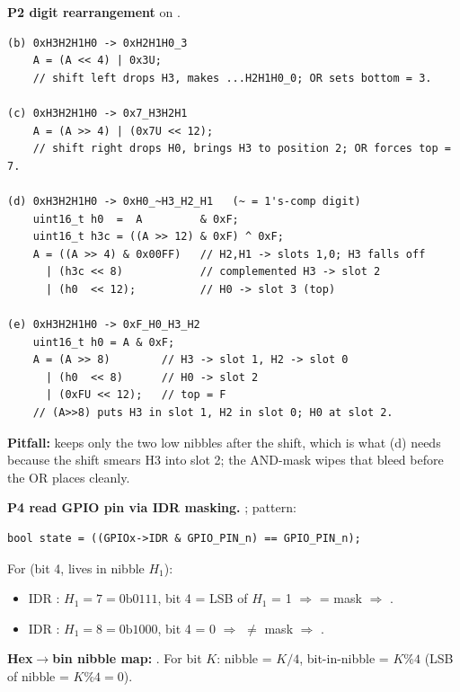 \begin{qp}\textbf{P2 digit rearrangement} on .
\begin{lstlisting}[language={}]
(b) 0xH3H2H1H0 -> 0xH2H1H0_3
    A = (A << 4) | 0x3U;
    // shift left drops H3, makes ...H2H1H0_0; OR sets bottom = 3.

(c) 0xH3H2H1H0 -> 0x7_H3H2H1
    A = (A >> 4) | (0x7U << 12);
    // shift right drops H0, brings H3 to position 2; OR forces top = 7.

(d) 0xH3H2H1H0 -> 0xH0_~H3_H2_H1   (~ = 1's-comp digit)
    uint16_t h0  =  A         & 0xF;
    uint16_t h3c = ((A >> 12) & 0xF) ^ 0xF;
    A = ((A >> 4) & 0x00FF)   // H2,H1 -> slots 1,0; H3 falls off
      | (h3c << 8)            // complemented H3 -> slot 2
      | (h0  << 12);          // H0 -> slot 3 (top)

(e) 0xH3H2H1H0 -> 0xF_H0_H3_H2
    uint16_t h0 = A & 0xF;
    A = (A >> 8)        // H3 -> slot 1, H2 -> slot 0
      | (h0  << 8)      // H0 -> slot 2
      | (0xFU << 12);   // top = F
    // (A>>8) puts H3 in slot 1, H2 in slot 0; H0 at slot 2.
\end{lstlisting}
\textbf{Pitfall:}  keeps only the two low nibbles after the shift, which is what (d) needs because the shift smears H3 into slot 2; the AND-mask wipes that bleed before the OR places  cleanly.\end{qp}

\begin{qp}\textbf{P4 read GPIO pin via IDR masking.} ; pattern:
\begin{lstlisting}[language={}]
bool state = ((GPIOx->IDR & GPIO_PIN_n) == GPIO_PIN_n);
\end{lstlisting}
For  (bit 4, lives in nibble $H_1$):
\begin{itemize}
\item IDR : $H_1=7=0\mathrm{b}0111$, bit 4 = LSB of $H_1$ = 1 $\Rightarrow$  = mask $\Rightarrow$ .
\item IDR : $H_1=8=0\mathrm{b}1000$, bit 4 = 0 $\Rightarrow$  $\ne$ mask $\Rightarrow$ .
\end{itemize}
\textbf{Hex$\to$bin nibble map:} . For bit $K$: nibble = $K/4$, bit-in-nibble = $K\%4$ (LSB of nibble = $K\%4=0$).\end{qp}

